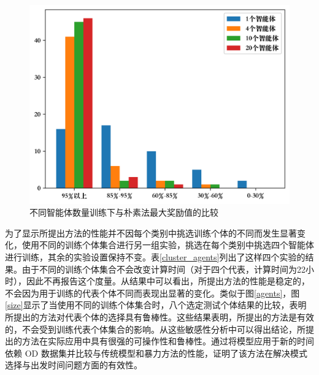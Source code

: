 \begin{figure}
  \centering
  \includegraphics[width=.75\linewidth]{figures/content/number.png}
  \caption{不同智能体数量训练下与朴素法最大奖励值的比较}
  \label{agent_map}
\end{figure}


为了显示所提出方法的性能并不因每个类别中挑选训练个体的不同而发生显著变化，使用不同的训练个体集合进行另一组实验，挑选在每个类别中挑选四个智能体进行训练，其余的实验设置保持不变。表\ref{cluster_agents}列出了这样四个实验的结果。由于不同的训练个体集合不会改变计算时间（对于四个代表，计算时间为22小时），因此不再报告这个度量。从结果中可以看出，所提出方法的性能是稳定的，不会因为用于训练的代表个体不同而表现出显著的变化。类似于图\ref{agents}，图\ref{size}显示了当使用不同的训练个体集合时，八个选定测试个体结果的比较，表明所提出的方法对代表个体的选择具有鲁棒性。这些结果表明，所提出的方法是有效的，不会受到训练代表个体集合的影响。从这些敏感性分析中可以得出结论，所提出的方法在实际应用中具有很强的可操作性和鲁棒性。通过将模型应用于新的时间依赖 OD 数据集并比较与传统模型和暴力方法的性能，证明了该方法在解决模式选择与出发时间问题方面的有效性。

